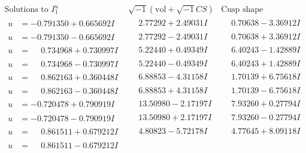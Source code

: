 \documentclass[1p]{elsarticle_modified}
\theoremstyle{definition}
\newcommand{\I}{\sqrt{-1}}
\begin{document}
$$\begin{array}{c|c|c}  
\text{Solutions to }I^u_{1}& \I (\text{vol} + \sqrt{-1}CS) & \text{Cusp shape}\\
 \hline 
\begin{aligned}
u &= -0.791350 + 0.665692 I\end{aligned}
 & \phantom{-}2.77292 + 2.49031 I & \phantom{-}0.70638 - 3.36912 I \\ \hline\begin{aligned}
u &= -0.791350 - 0.665692 I\end{aligned}
 & \phantom{-}2.77292 - 2.49031 I & \phantom{-}0.70638 + 3.36912 I \\ \hline\begin{aligned}
u &= \phantom{-}0.734968 + 0.730997 I\end{aligned}
 & \phantom{-}5.22440 + 0.49349 I & \phantom{-}6.40243 - 1.42889 I \\ \hline\begin{aligned}
u &= \phantom{-}0.734968 - 0.730997 I\end{aligned}
 & \phantom{-}5.22440 - 0.49349 I & \phantom{-}6.40243 + 1.42889 I \\ \hline\begin{aligned}
u &= \phantom{-}0.862163 + 0.360448 I\end{aligned}
 & \phantom{-}6.88853 - 4.31158 I & \phantom{-}1.70139 + 6.75618 I \\ \hline\begin{aligned}
u &= \phantom{-}0.862163 - 0.360448 I\end{aligned}
 & \phantom{-}6.88853 + 4.31158 I & \phantom{-}1.70139 - 6.75618 I \\ \hline\begin{aligned}
u &= -0.720478 + 0.790919 I\end{aligned}
 & \phantom{-}13.50980 - 2.17197 I & \phantom{-}7.93260 + 0.27794 I \\ \hline\begin{aligned}
u &= -0.720478 - 0.790919 I\end{aligned}
 & \phantom{-}13.50980 + 2.17197 I & \phantom{-}7.93260 - 0.27794 I \\ \hline\begin{aligned}
u &= \phantom{-}0.861511 + 0.679212 I\end{aligned}
 & \phantom{-}4.80823 - 5.72178 I & \phantom{-}4.77645 + 8.09118 I \\ \hline\begin{aligned}
u &= \phantom{-}0.861511 - 0.679212 I\end{aligned}

\end{array}$$
\end{document}
